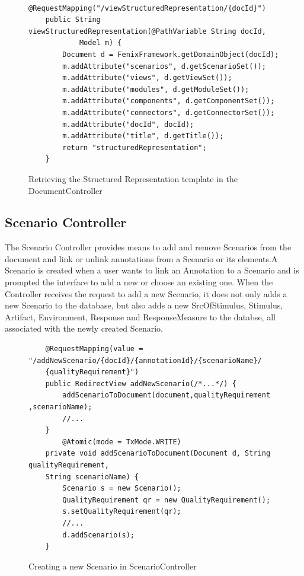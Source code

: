 \begin{itemize}
\begin{figure}[h]
\lstset{style=customjava}
\begin{lstlisting}
	@RequestMapping("/viewStructuredRepresentation/{docId}")
	public String viewStructuredRepresentation(@PathVariable String docId,
			Model m) {
		Document d = FenixFramework.getDomainObject(docId);
		m.addAttribute("scenarios", d.getScenarioSet());
		m.addAttribute("views", d.getViewSet());
		m.addAttribute("modules", d.getModuleSet());
		m.addAttribute("components", d.getComponentSet());
		m.addAttribute("connectors", d.getConnectorSet());
		m.addAttribute("docId", docId);
		m.addAttribute("title", d.getTitle());
		return "structuredRepresentation";
	}
\end{lstlisting}
\caption{Retrieving the Structured Representation template in the DocumentController}
\label{figure:documentControllerStructuredRepresentation}
\end{figure}
\end{itemize}

\subsection{Scenario Controller}

The Scenario Controller provides means to add and remove Scenarios from the document and link or unlink annotations from a Scenario or its elements.A Scenario is created when a user wants to link an Annotation to a Scenario and is prompted the interface to add a new or choose an existing one. When the Controller receives the request to add a new Scenario, it does not only adds a new Scenario to the database, but also adds a new SrcOfStimulus, Stimulus, Artifact, Environment, Response and ResponseMeasure to the databse, all associated with the newly created Scenario. 

\begin{figure}[h]
\lstset{style=customjava}
\begin{lstlisting}
	@RequestMapping(value = "/addNewScenario/{docId}/{annotationId}/{scenarioName}/
	{qualityRequirement}")
	public RedirectView addNewScenario(/*...*/) {
		addScenarioToDocument(document,qualityRequirement ,scenarioName);		
		//...
	}
		@Atomic(mode = TxMode.WRITE)
	private void addScenarioToDocument(Document d, String qualityRequirement, 
	String scenarioName) {
		Scenario s = new Scenario();
		QualityRequirement qr = new QualityRequirement();
		s.setQualityRequirement(qr);
		//...		
		d.addScenario(s);
	}	
\end{lstlisting}
\caption{Creating a new Scenario in ScenarioController}
\label{figure:scenarioControllerNewScenario}
\end{figure}

